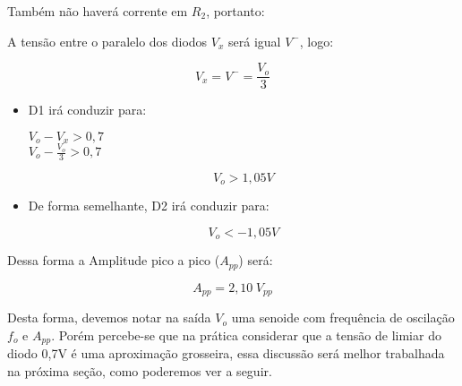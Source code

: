 Também não haverá corrente em $R_2$, portanto:

A tensão entre o paralelo dos diodos $V_x$ será igual $V^-$, logo:

\begin{equation} \label{int}
V_x = V^- = \frac{V_o}{3}
\end{equation}

\begin{itemize}
    \item D1 irá conduzir para:
   
    \begin{center}
        $V_o - V_x > 0,7$ \\
        $V_o - \frac{V_o}{3} > 0,7 $\\
    
    \end{center}
    \begin{equation} \label{mai}
     V_o > 1,05 V
    \end{equation}
    

    
    \item De forma semelhante, D2 irá conduzir para:
    
    \begin{equation} \label{men}
     V_o < - 1,05 V
    \end{equation}
    
\end{itemize}

Dessa forma a Amplitude pico a pico ($A_{pp}$) será:

\begin{equation} \label{int}
    A_{pp} = 2,10  \hspace{3pt} V_{pp}
\end{equation}

Desta forma, devemos notar na saída $V_o$ uma senoide com frequência de oscilação $f_o$ e $A_{pp}$. Porém percebe-se que na prática considerar que a tensão de limiar do diodo 0,7V é uma aproximação grosseira, essa discussão será melhor trabalhada na próxima seção, como poderemos ver a seguir.